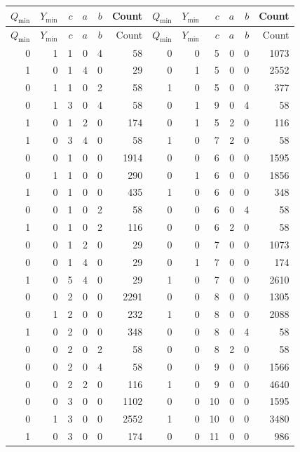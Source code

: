 \documentclass[11pt,letterpaper]{article}
\theoremstyle{definition}
\theoremstyle{remark}
\begin{document}
\begin{center}\small
\begin{longtable}{@{}rr rrr r @{\qquad} rr rrr r@{}}
\toprule
$Q_{\min}$ & $Y_{\min}$ & $c$ & $a$ & $b$ & Count & $Q_{\min}$ & $Y_{\min}$ & $c$ & $a$ & $b$ & Count\\\midrule\endfirsthead
\toprule
$Q_{\min}$ & $Y_{\min}$ & $c$ & $a$ & $b$ & Count & $Q_{\min}$ & $Y_{\min}$ & $c$ & $a$ & $b$ & Count\\\midrule\endhead
0 & 1 & 1 & 0 & 4 & 58 & 0 & 0 & 5 & 0 & 0 & 1073\\
1 & 0 & 1 & 4 & 0 & 29 & 0 & 1 & 5 & 0 & 0 & 2552\\
0 & 1 & 1 & 0 & 2 & 58 & 1 & 0 & 5 & 0 & 0 & 377\\
0 & 1 & 3 & 0 & 4 & 58 & 0 & 1 & 9 & 0 & 4 & 58\\
1 & 0 & 1 & 2 & 0 & 174 & 0 & 1 & 5 & 2 & 0 & 116\\
1 & 0 & 3 & 4 & 0 & 58 & 1 & 0 & 7 & 2 & 0 & 58\\
0 & 0 & 1 & 0 & 0 & 1914 & 0 & 0 & 6 & 0 & 0 & 1595\\
0 & 1 & 1 & 0 & 0 & 290 & 0 & 1 & 6 & 0 & 0 & 1856\\
1 & 0 & 1 & 0 & 0 & 435 & 1 & 0 & 6 & 0 & 0 & 348\\
0 & 0 & 1 & 0 & 2 & 58 & 0 & 0 & 6 & 0 & 4 & 58\\
1 & 0 & 1 & 0 & 2 & 116 & 0 & 0 & 6 & 2 & 0 & 58\\
0 & 0 & 1 & 2 & 0 & 29 & 0 & 0 & 7 & 0 & 0 & 1073\\
0 & 0 & 1 & 4 & 0 & 29 & 0 & 1 & 7 & 0 & 0 & 174\\
1 & 0 & 5 & 4 & 0 & 29 & 1 & 0 & 7 & 0 & 0 & 2610\\
0 & 0 & 2 & 0 & 0 & 2291 & 0 & 0 & 8 & 0 & 0 & 1305\\
0 & 1 & 2 & 0 & 0 & 232 & 1 & 0 & 8 & 0 & 0 & 2088\\
1 & 0 & 2 & 0 & 0 & 348 & 0 & 0 & 8 & 0 & 4 & 58\\
0 & 0 & 2 & 0 & 2 & 58 & 0 & 0 & 8 & 2 & 0 & 58\\
0 & 0 & 2 & 0 & 4 & 58 & 0 & 0 & 9 & 0 & 0 & 1566\\
0 & 0 & 2 & 2 & 0 & 116 & 1 & 0 & 9 & 0 & 0 & 4640\\
0 & 0 & 3 & 0 & 0 & 1102 & 0 & 0 & 10 & 0 & 0 & 1595\\
0 & 1 & 3 & 0 & 0 & 2552 & 1 & 0 & 10 & 0 & 0 & 3480\\
1 & 0 & 3 & 0 & 0 & 174 & 0 & 0 & 11 & 0 & 0 & 986\\

\end{longtable}
\end{center}
\end{document}
